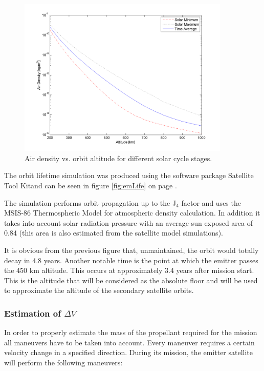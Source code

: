 \begin{figure}[ht!]
\centering
\includegraphics[width=0.9\textwidth, angle=0]{chapters/img/densityAltitude.png}
\caption{Air density vs. orbit altitude for different solar cycle stages.}
\label{fig:densityProfile}
\end{figure}

The orbit lifetime simulation was produced using the software package Satellite Tool Kit\texttrademark and can be seen in figure \ref{fig:emLife} on page \pageref{fig:emLife}.

The simulation performs orbit propagation up to the J$_4$ factor and uses the MSIS-86 Thermospheric Model for atmospheric density calculation. In addition it takes into account solar radiation pressure with an average sun exposed area of 0.84 (this area is also estimated from the satellite model simulations).

It is obvious from the previous figure that, unmaintained, the orbit would totally decay in 4.8 years. Another notable time is the point at which the emitter passes the 450 km altitude. This occurs at approximately 3.4 years after mission start. This is the altitude that will be considered as the absolute floor and will be used to approximate the altitude of the secondary satellite orbits.


\subsubsection{Estimation of $\Delta V$}
\label{frEmDV}

In order to properly estimate the mass of the propellant required for the mission all maneuvers have to be taken into account. Every maneuver requires a certain velocity change in a specified direction. During its mission, the emitter satellite will perform the following maneuvers:

